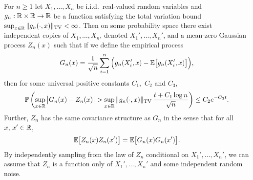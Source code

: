 \begin{lemma}
  \label{lem:kmt_corollary}

  For $n \geq 1$
  let $X_1, \ldots, X_n$
  be i.i.d.\ real-valued random variables and
  $g_n: \mathbb{R} \times \mathbb{R} \to \mathbb{R}$
  be a function satisfying
  the total variation bound
  $\sup_{x \in \mathbb{R}} \|g_n(\cdot, x)\|_{\mathrm{TV}} < \infty$.
  Then on some probability space
  there exist independent copies of
  $X_1, \ldots, X_n$,
  denoted
  $X_1', \ldots, X_n'$,
  and a mean-zero Gaussian process $Z_n(x)$
  such that if we define
  the empirical process
  \begin{align*}
    G_n(x)
    = \frac{1}{\sqrt n} \sum_{i=1}^n
    \Big(g_n(X_i',x) - \mathbb{E}\big[g_n(X_i',x)\big]\Big),
  \end{align*}
  then
  for some universal positive constants
  $C_1,$ $C_2$ and $C_3$,
  \begin{align*}
    \mathbb{P}\left(
      \sup_{x \in \mathbb{R}}
      \big|G_n(x) - Z_n(x)\big|
      > \sup_{x \in \mathbb{R}} \|g_n(\cdot, x)\|_{\mathrm{TV}}
      \, \frac{t + C_1 \log n}{\sqrt n}
    \right)
    \leq C_2 e^{-C_3 t}.
  \end{align*}
  Further, $Z_n$
  has the same covariance structure as $G_n$
  in the sense that for all $x,\, x' \in \mathbb{R}$,
  \begin{align*}
    \mathbb{E}\big[Z_n(x) Z_n(x')\big]
    = \mathbb{E}\big[G_n(x) G_n(x')\big].
  \end{align*}
  By independently sampling from the law of
  $Z_n$ conditional on $X_1', \ldots, X_n'$,
  we can assume that
  $Z_n$ is a function only of $X_1', \ldots, X_n'$
  and some independent random noise.

\end{lemma}

